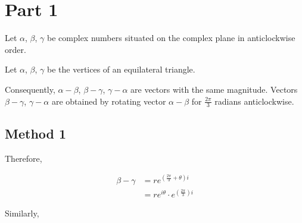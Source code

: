 \documentclass{article}
\begin{document}
\section{Part 1}

Let $\alpha$, $\beta$, $\gamma$ be complex numbers situated on the complex plane in anticlockwise order.

\vspace{\baselineskip}

Let $\alpha$, $\beta$, $\gamma$ be the vertices of an equilateral triangle.


\vspace{\baselineskip}

Consequently, $\alpha - \beta$, $\beta - \gamma$, $\gamma - \alpha$ are vectors with the same magnitude. Vectors $\beta - \gamma$, $\gamma - \alpha$ are obtained by rotating vector $\alpha - \beta$ for $\frac{2\pi}{3}$ radians anticlockwise.

\subsection{Method 1}

Therefore,

\begin{equation}
    \begin{split}
        \beta - \gamma & = re^{(\frac{2\pi}{3} + \theta)i} \\
        & = re^{i\theta} \cdot e^{(\frac{2\pi}{3})i}
    \end{split}
\end{equation}

Similarly,
\end{document}
